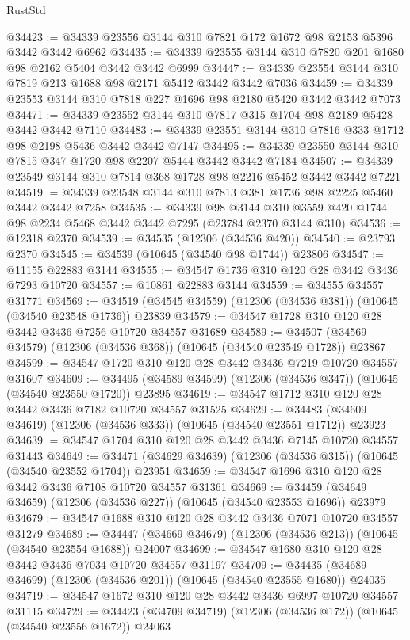 \begin{lexlean}{RustStd}
\begin{coremodule}
@34423 := @34339 @23556 @3144 @310 @7821 @172 @1672 @98 @2153 @5396 @3442 @3442 @6962
@34435 := @34339 @23555 @3144 @310 @7820 @201 @1680 @98 @2162 @5404 @3442 @3442 @6999
@34447 := @34339 @23554 @3144 @310 @7819 @213 @1688 @98 @2171 @5412 @3442 @3442 @7036
@34459 := @34339 @23553 @3144 @310 @7818 @227 @1696 @98 @2180 @5420 @3442 @3442 @7073
@34471 := @34339 @23552 @3144 @310 @7817 @315 @1704 @98 @2189 @5428 @3442 @3442 @7110
@34483 := @34339 @23551 @3144 @310 @7816 @333 @1712 @98 @2198 @5436 @3442 @3442 @7147
@34495 := @34339 @23550 @3144 @310 @7815 @347 @1720 @98 @2207 @5444 @3442 @3442 @7184
@34507 := @34339 @23549 @3144 @310 @7814 @368 @1728 @98 @2216 @5452 @3442 @3442 @7221
@34519 := @34339 @23548 @3144 @310 @7813 @381 @1736 @98 @2225 @5460 @3442 @3442 @7258
@34535 := @34339
    @98
    @3144
    @310
    @3559
    @420
    @1744
    @98
    @2234
    @5468
    @3442
    @3442
    @7295
    (@23784 @2370 @3144 @310)
@34536 := @12318 @2370
@34539 := @34535 (@12306 (@34536 @420))
@34540 := @23793 @2370
@34545 := @34539 (@10645 (@34540 @98 @1744)) @23806
@34547 := @11155 @22883 @3144
@34555 := @34547 @1736 @310 @120 @28 @3442 @3436 @7293 @10720
@34557 := @10861 @22883 @3144
@34559 := @34555 @34557 @31771
@34569 := @34519 (@34545 @34559) (@12306 (@34536 @381)) (@10645 (@34540 @23548 @1736)) @23839
@34579 := @34547 @1728 @310 @120 @28 @3442 @3436 @7256 @10720 @34557 @31689
@34589 := @34507 (@34569 @34579) (@12306 (@34536 @368)) (@10645 (@34540 @23549 @1728)) @23867
@34599 := @34547 @1720 @310 @120 @28 @3442 @3436 @7219 @10720 @34557 @31607
@34609 := @34495 (@34589 @34599) (@12306 (@34536 @347)) (@10645 (@34540 @23550 @1720)) @23895
@34619 := @34547 @1712 @310 @120 @28 @3442 @3436 @7182 @10720 @34557 @31525
@34629 := @34483 (@34609 @34619) (@12306 (@34536 @333)) (@10645 (@34540 @23551 @1712)) @23923
@34639 := @34547 @1704 @310 @120 @28 @3442 @3436 @7145 @10720 @34557 @31443
@34649 := @34471 (@34629 @34639) (@12306 (@34536 @315)) (@10645 (@34540 @23552 @1704)) @23951
@34659 := @34547 @1696 @310 @120 @28 @3442 @3436 @7108 @10720 @34557 @31361
@34669 := @34459 (@34649 @34659) (@12306 (@34536 @227)) (@10645 (@34540 @23553 @1696)) @23979
@34679 := @34547 @1688 @310 @120 @28 @3442 @3436 @7071 @10720 @34557 @31279
@34689 := @34447 (@34669 @34679) (@12306 (@34536 @213)) (@10645 (@34540 @23554 @1688)) @24007
@34699 := @34547 @1680 @310 @120 @28 @3442 @3436 @7034 @10720 @34557 @31197
@34709 := @34435 (@34689 @34699) (@12306 (@34536 @201)) (@10645 (@34540 @23555 @1680)) @24035
@34719 := @34547 @1672 @310 @120 @28 @3442 @3436 @6997 @10720 @34557 @31115
@34729 := @34423 (@34709 @34719) (@12306 (@34536 @172)) (@10645 (@34540 @23556 @1672)) @24063

\end{coremodule}
\end{lexlean}
